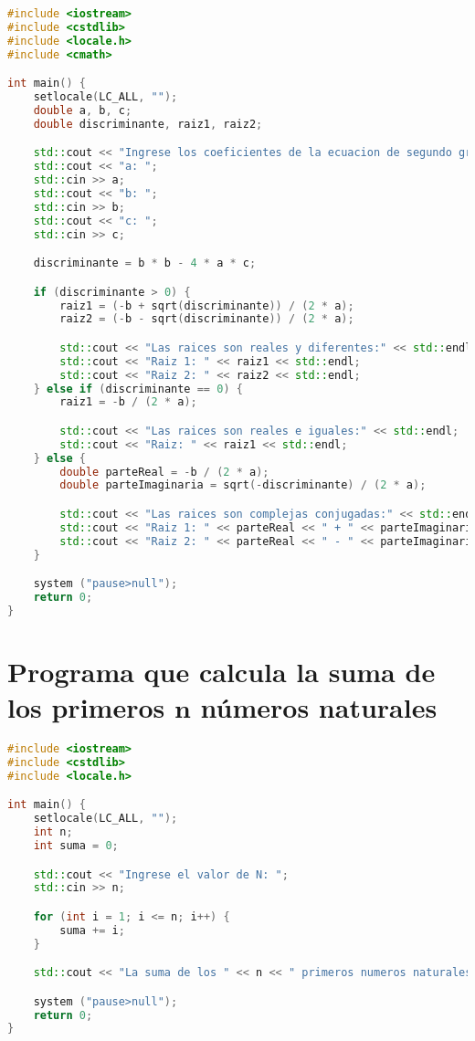 \noindent
\begin{lstlisting}[language=C++]
#include <iostream>
#include <cstdlib>
#include <locale.h>
#include <cmath>

int main() {
    setlocale(LC_ALL, "");
    double a, b, c;
    double discriminante, raiz1, raiz2;

    std::cout << "Ingrese los coeficientes de la ecuacion de segundo grado:" << std::endl;
    std::cout << "a: ";
    std::cin >> a;
    std::cout << "b: ";
    std::cin >> b;
    std::cout << "c: ";
    std::cin >> c;

    discriminante = b * b - 4 * a * c;

    if (discriminante > 0) {
        raiz1 = (-b + sqrt(discriminante)) / (2 * a);
        raiz2 = (-b - sqrt(discriminante)) / (2 * a);

        std::cout << "Las raices son reales y diferentes:" << std::endl;
        std::cout << "Raiz 1: " << raiz1 << std::endl;
        std::cout << "Raiz 2: " << raiz2 << std::endl;
    } else if (discriminante == 0) {
        raiz1 = -b / (2 * a);

        std::cout << "Las raices son reales e iguales:" << std::endl;
        std::cout << "Raiz: " << raiz1 << std::endl;
    } else {
        double parteReal = -b / (2 * a);
        double parteImaginaria = sqrt(-discriminante) / (2 * a);

        std::cout << "Las raices son complejas conjugadas:" << std::endl;
        std::cout << "Raiz 1: " << parteReal << " + " << parteImaginaria << "i" << std::endl;
        std::cout << "Raiz 2: " << parteReal << " - " << parteImaginaria << "i" << std::endl;
    }

	system ("pause>null");
	return 0;
}

\end{lstlisting}

\section*{Programa que calcula la suma de los primeros $\bm{n}$ números naturales}

\noindent
\begin{lstlisting}[language=C++]
#include <iostream>
#include <cstdlib>
#include <locale.h>

int main() {
    setlocale(LC_ALL, "");
    int n;
    int suma = 0;

    std::cout << "Ingrese el valor de N: ";
    std::cin >> n;

    for (int i = 1; i <= n; i++) {
        suma += i;
    }

    std::cout << "La suma de los " << n << " primeros numeros naturales es: " << suma << std::endl;

	system ("pause>null");
	return 0;
}

\end{lstlisting}

